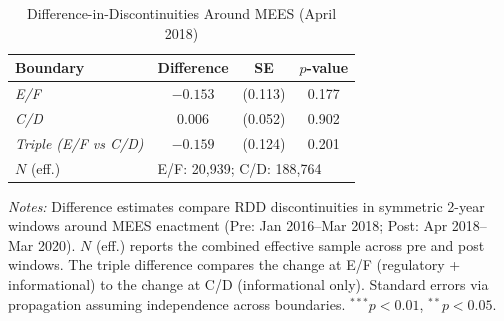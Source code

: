 \begin{table}[htbp]
\centering
\caption{Difference-in-Discontinuities Around MEES (April 2018)}
\label{tab:diff_disc}
\begin{tabular}{lccc}
\toprule
Boundary & Difference & SE & $p$-value \\
\midrule
\textit{E/F} & $-0.153$ & (0.113) & 0.177 \\
\textit{C/D} & $0.006$ & (0.052) & 0.902 \\
\addlinespace
\textit{Triple (E/F vs C/D)} & $-0.159$ & (0.124) & 0.201 \\
\midrule
$N$ (eff.) & \multicolumn{3}{l}{E/F: 20,939; C/D: 188,764} \\
\bottomrule
\end{tabular}
\begin{minipage}{\textwidth}
\footnotesize
\textit{Notes:} Difference estimates compare RDD discontinuities in symmetric 2-year windows
around MEES enactment (Pre: Jan 2016--Mar 2018; Post: Apr 2018--Mar 2020).
$N$ (eff.) reports the combined effective sample across pre and post windows.
The triple difference compares the change at E/F (regulatory + informational) to the change
at C/D (informational only). Standard errors via propagation assuming independence across boundaries.
$^{***}p<0.01$, $^{**}p<0.05$.
\end{minipage}
\end{table}

